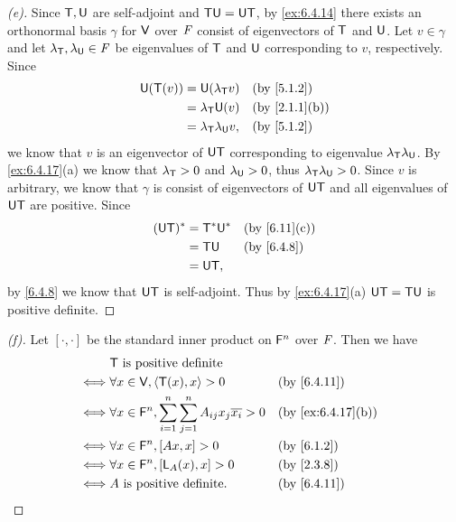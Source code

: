 \begin{proof}[(e)]
  Since \(\mathsf{T}, \mathsf{U}\) are self-adjoint and \(\mathsf{T} \mathsf{U} = \mathsf{U} \mathsf{T}\), by \cref{ex:6.4.14} there exists an orthonormal basis \(\gamma\) for \(\mathsf{V}\) over \(\mathit{F}\) consist of eigenvectors of \(\mathsf{T}\) and \(\mathsf{U}\).
  Let \(v \in \gamma\) and let \(\lambda_{\mathsf{T}}, \lambda_{\mathsf{U}} \in \mathit{F}\) be eigenvalues of \(\mathsf{T}\) and \(\mathsf{U}\) corresponding to \(v\), respectively.
  Since
  \begin{align*}
    \U(\T(v)) & = \U(\lambda_{\T} v)           &  & \text{(by \cref{5.1.2})}    \\
              & = \lambda_{\T} \U(v)           &  & \text{(by \cref{2.1.1}(b))} \\
              & = \lambda_{\T} \lambda_{\U} v, &  & \text{(by \cref{5.1.2})}
  \end{align*}
  we know that \(v\) is an eigenvector of \(\mathsf{U} \mathsf{T}\) corresponding to eigenvalue \(\lambda_{\mathsf{T}} \lambda_{\mathsf{U}}\).
  By \cref{ex:6.4.17}(a) we know that \(\lambda_{\mathsf{T}} > 0\) and \(\lambda_{\mathsf{U}} > 0\), thus \(\lambda_{\mathsf{T}} \lambda_{\mathsf{U}} > 0\).
  Since \(v\) is arbitrary, we know that \(\gamma\) is consist of eigenvectors of \(\mathsf{U} \mathsf{T}\) and all eigenvalues of \(\mathsf{U} \mathsf{T}\) are positive.
  Since
  \begin{align*}
    (\U \T)^* & = \T^* \U^* &  & \text{(by \cref{6.11}(c))} \\
              & = \T \U     &  & \text{(by \cref{6.4.8})}   \\
              & = \U \T,
  \end{align*}
  by \cref{6.4.8} we know that \(\mathsf{U} \mathsf{T}\) is self-adjoint.
  Thus by \cref{ex:6.4.17}(a) \(\mathsf{U} \mathsf{T} = \mathsf{T} \mathsf{U}\) is positive definite.
\end{proof}

\begin{proof}[(f)]
  Let \([\cdot, \cdot]\) be the standard inner product on \(\mathsf{F}^n\) over \(\mathit{F}\).
  Then we have
  \begin{align*}
         & \T \text{ is positive definite}                                                                                       \\
    \iff & \forall x \in \V, \inn{\T(x), x} > 0                                             &  & \text{(by \cref{6.4.11})}       \\
    \iff & \forall x \in \vs{F}^n, \sum_{i = 1}^n \sum_{j = 1}^n A_{i j} x_j \conj{x_i} > 0 &  & \text{(by \cref{ex:6.4.17}(b))} \\
    \iff & \forall x \in \vs{F}^n, [Ax, x] > 0                                              &  & \text{(by \cref{6.1.2})}        \\
    \iff & \forall x \in \vs{F}^n, [\L_A(x), x] > 0                                         &  & \text{(by \cref{2.3.8})}        \\
    \iff & A \text{ is positive definite}.                                                  &  & \text{(by \cref{6.4.11})}
  \end{align*}
\end{proof}
